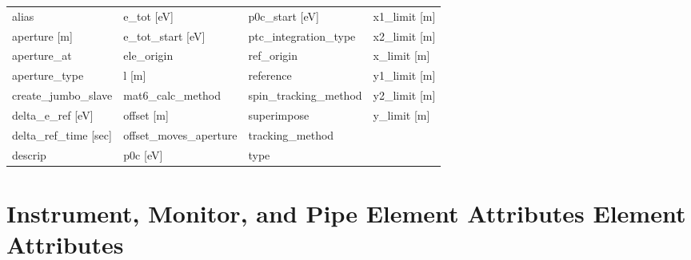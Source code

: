  \begin{tabular}{llll} \toprule
alias                          & e_tot [eV]                     & p0c_start [eV]                 & x1_limit [m]                   \\
aperture [m]                   & e_tot_start [eV]               & ptc_integration_type           & x2_limit [m]                   \\
aperture_at                    & ele_origin                     & ref_origin                     & x_limit [m]                    \\
aperture_type                  & l [m]                          & reference                      & y1_limit [m]                   \\
create_jumbo_slave             & mat6_calc_method               & spin_tracking_method           & y2_limit [m]                   \\
delta_e_ref [eV]               & offset [m]                     & superimpose                    & y_limit [m]                    \\
delta_ref_time [sec]           & offset_moves_aperture          & tracking_method                &                                \\
descrip                        & p0c [eV]                       & type                           &                                \\
 \bottomrule
 \end{tabular}
 \vfill

 \section{Instrument, Monitor, and Pipe Element Attributes Element Attributes}
 \label{s:list.instrument}

